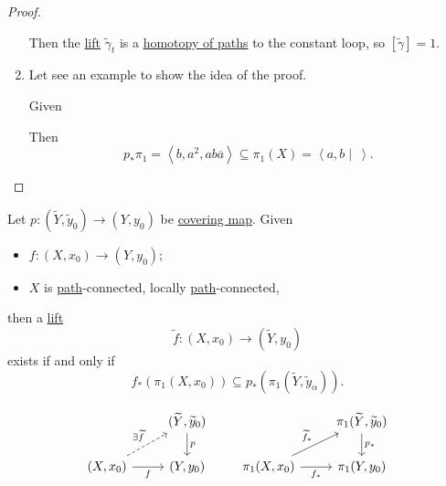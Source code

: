 \begin{proof}
\begin{enumerate}
		      \par Then the \hyperref[prop:homotopy-lifting-property]{lift} \(\widetilde{\gamma} _{t}\) is a \hyperref[def:homotopy-path]{homotopy of paths}
		      to the constant loop, so \([\widetilde{\gamma} ] = 1\).
		\item Let see an example to show the idea of the proof.
		      \begin{eg}
			      Given
			      \begin{figure}[H]
				      \centering
				      \label{fig:eg:lec14:2}
			      \end{figure}
		      \end{eg}
		      Then
		      \[
			      p_*\pi _1 = \left< b, a^{2} , ab \overline{a}  \right> \subseteq \pi _1(X) = \left< a, b \mid \ \right>.
		      \]
	\end{enumerate}
\end{proof}
\begin{proposition}\label{prop:lifting-criterion}
	Let \(p\colon (\widetilde{Y} , \widetilde{y} _0)\to (Y, y_0 )\) be \hyperref[def:covering-map]{covering map}. Given
	\begin{itemize}
		\item \(f\colon (X, x_0) \to (Y, y_0)\);
		\item \(X\) is \hyperref[def:path]{path}-connected, locally \hyperref[def:path]{path}-connected,
	\end{itemize}
	then a \hyperref[prop:homotopy-lifting-property]{lift}
	\[
		\widetilde{f} \colon (X, x_0)\to (\widetilde{Y} , y_0)
	\]
	exists if and only if
	\[
		f_*\left(\pi _1(X, x_0)\right)\subseteq p_*\left(\pi _1(\widetilde{Y} , \widetilde{y} _\alpha )\right).
	\]

	\[\begin{tikzcd}
			& {(\widetilde{Y}, \widetilde{y}_0)} \\
			{(X, x_0)} & {(Y, y_0)}
			\arrow["p", from=1-2, to=2-2]
			\arrow["f"', from=2-1, to=2-2]
			\arrow["{\exists \widetilde{f}}", dashed, from=2-1, to=1-2]
		\end{tikzcd}\qquad
		\begin{tikzcd}
			& {\pi_1(\widetilde{Y}, \widetilde{y}_0)} \\
			{\pi_1(X, x_0)} & {\pi_1(Y, y_0)}
			\arrow["{f_\ast}"', from=2-1, to=2-2]
			\arrow["{p_\ast}", from=1-2, to=2-2]
			\arrow["{\widetilde{f}_\ast}", from=2-1, to=1-2]
		\end{tikzcd}\]
\end{proposition}